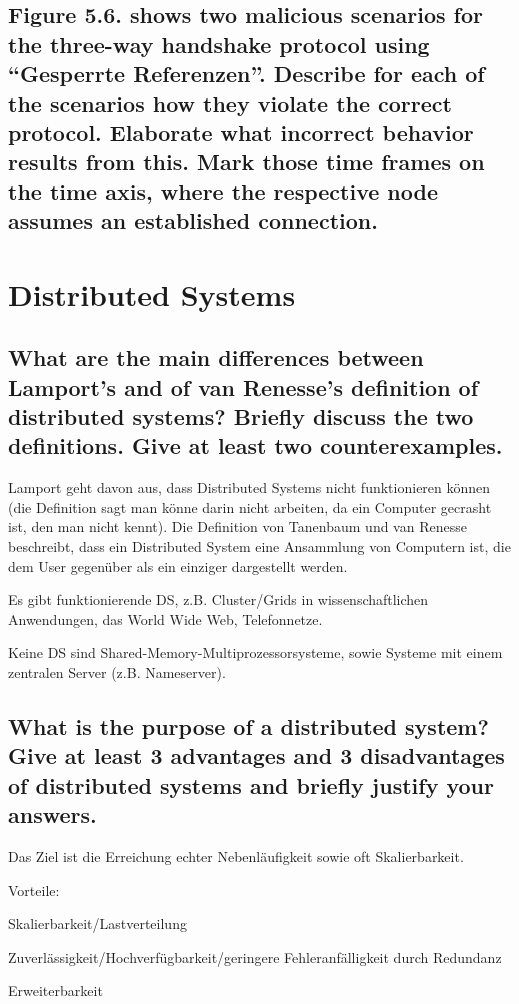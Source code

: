 \documentclass[a4paper,
			llpt,
			solution,
			accentcolor=tud2d,
			colorbacktitle
			]
			{tudexercise}
\begin{document}
\subsection{Figure 5.6. shows two malicious scenarios for the three-way handshake protocol using “Gesperrte Referenzen”. Describe for each of the scenarios how they violate the correct protocol. Elaborate what incorrect behavior results from this. Mark those time frames on the time axis, where the respective node assumes an established connection.}
\section{Distributed Systems}
\subsection{What are the main differences between Lamport’s and of van Renesse’s definition of distributed systems? Briefly discuss the two definitions. Give at least two counterexamples.}
Lamport geht davon aus, dass Distributed Systems nicht funktionieren können (die Definition sagt man könne darin nicht arbeiten, da ein Computer gecrasht ist, den man nicht kennt). Die Definition von Tanenbaum und van Renesse beschreibt, dass ein Distributed System eine Ansammlung von Computern ist, die dem User gegenüber als ein einziger dargestellt werden.

Es gibt funktionierende DS, z.B. Cluster/Grids in wissenschaftlichen Anwendungen, das World Wide Web, Telefonnetze.

Keine DS sind Shared-Memory-Multiprozessorsysteme, sowie Systeme mit einem zentralen Server (z.B. Nameserver).


\subsection{What is the purpose of a distributed system? Give at least 3 advantages and 3 disadvantages of distributed systems and briefly justify your answers.}
Das Ziel ist die Erreichung echter Nebenläufigkeit sowie oft Skalierbarkeit.

Vorteile:
\begin{compactitem}
\item Skalierbarkeit/Lastverteilung
\item Zuverlässigkeit/Hochverfügbarkeit/geringere Fehleranfälligkeit durch Redundanz
\item Erweiterbarkeit
\end{compactitem}
\end{document}
